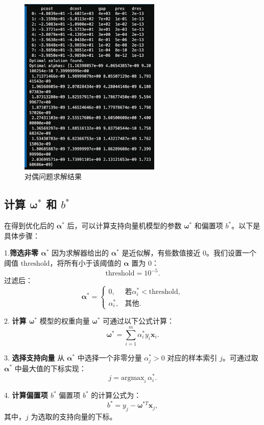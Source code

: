 \documentclass[12pt,a4paper,oneside]{article}
\begin{document}
\begin{figure}[H]
    \centering
    \includegraphics[width=0.6\textwidth]{image/6.png}
    \caption{对偶问题求解结果}
\end{figure}
\subsection{计算 $\bm{\omega}^*$ 和 $b^*$}
在得到优化后的 $\pmb{\alpha}^*$ 后，可以计算支持向量机模型的参数 $\pmb{\omega}^*$ 和偏置项 $b^*$。以下是具体步骤：

1.\textbf{筛选非零 $\pmb{\alpha}^*$}
   因为求解器给出的 $\pmb{\alpha}^*$ 是近似解，有些数值接近 0。我们设置一个阈值 $\text{threshold}$，将所有小于该阈值的 $\pmb{\alpha}$ 置为 0：
   \[
   \text{threshold} = 10^{-5}.
   \]
   过滤后：
   \[
   \pmb{\alpha}^* = 
   \begin{cases} 
   0, & \text{若} \alpha_i^* < \text{threshold}, \\
   \alpha_i^*, & \text{其他}.
   \end{cases}
   \]

2. \textbf{计算 $\pmb{\omega}^*$  }
   模型的权重向量 $\pmb{\omega}^*$ 可通过以下公式计算：
   \[
   \pmb{\omega}^* = \sum_{i=1}^m \alpha_i^* y_i \pmb{x}_i.
   \]

3. \textbf{选择支持向量  }
   从 $\pmb{\alpha}^*$ 中选择一个非零分量 $\alpha_j^* > 0$ 对应的样本索引 $j$。可通过取 $\pmb{\alpha}^*$ 中最大值的下标实现：
   \[
   j = \text{argmax}_i \, \alpha_i^*.
   \]

4.\textbf{ 计算偏置项 $b^*$ } 
   偏置项 $b^*$ 的计算公式为：
   \[
   b^* = y_j - \pmb{\omega}^{*T} \pmb{x}_j,
   \]
   其中，$j$ 为选取的支持向量的下标。
\end{document}
